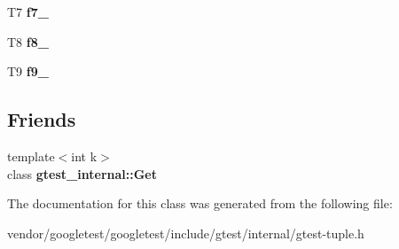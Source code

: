 \begin{DoxyCompactItemize}
\item 
T7 {\bfseries f7\+\_\+}\hypertarget{classstd_1_1tr1_1_1tuple_a7c28780e616d382833e844f62672c6bc}{}\label{classstd_1_1tr1_1_1tuple_a7c28780e616d382833e844f62672c6bc}

\item 
T8 {\bfseries f8\+\_\+}\hypertarget{classstd_1_1tr1_1_1tuple_ae859012c83943e54e035a4a32089ccb6}{}\label{classstd_1_1tr1_1_1tuple_ae859012c83943e54e035a4a32089ccb6}

\item 
T9 {\bfseries f9\+\_\+}\hypertarget{classstd_1_1tr1_1_1tuple_a336d5e582fd34e45ec88c78d473671dd}{}\label{classstd_1_1tr1_1_1tuple_a336d5e582fd34e45ec88c78d473671dd}

\end{DoxyCompactItemize}
\subsection*{Friends}
\begin{DoxyCompactItemize}
\item 
{\footnotesize template$<$int k$>$ }\\class {\bfseries gtest\+\_\+internal\+::\+Get}\hypertarget{classstd_1_1tr1_1_1tuple_aeeed38755abdaa78587dd1eac9ccc950}{}\label{classstd_1_1tr1_1_1tuple_aeeed38755abdaa78587dd1eac9ccc950}

\end{DoxyCompactItemize}


The documentation for this class was generated from the following file\+:\begin{DoxyCompactItemize}
\item 
vendor/googletest/googletest/include/gtest/internal/gtest-\/tuple.\+h\end{DoxyCompactItemize}
